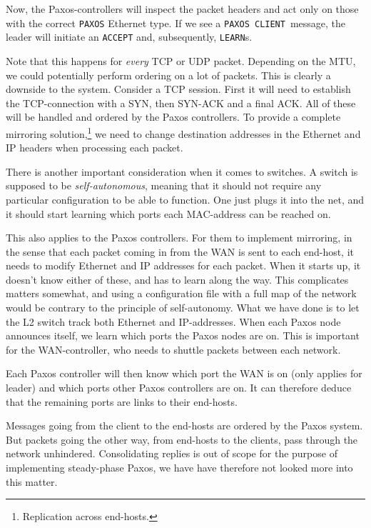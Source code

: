 Now, the Paxos-controllers will inspect the packet headers and act only on
those with the correct \texttt{PAXOS} Ethernet type.  If we see a
\texttt{PAXOS CLIENT} message, the leader will initiate an \texttt{ACCEPT}
and, subsequently, \texttt{LEARN}s.

Note that this happens for \textit{every} \ac{TCP} or \ac{UDP} packet.
Depending on the \ac{MTU}, we could potentially perform ordering on a lot of
packets.  This is clearly a downside to the system.  Consider a \acs{TCP}
session. First it will need to establish the \acs{TCP}-connection with a
SYN, then SYN-ACK and a final ACK.
All of these will be handled and ordered by the Paxos controllers.
To provide a complete mirroring solution,\footnote{Replication across
end-hosts.} we need to change destination addresses in the Ethernet and
\ac{IP} headers when processing each packet.

There is another important consideration when it comes to switches.
A switch is supposed to be \textit{self-autonomous}, meaning that it should
not require any particular configuration to be able to function. One just
plugs it into the net, and it should start learning which ports each
MAC-address can be reached on.  

This also applies to the Paxos controllers. For them to implement mirroring,
in the sense that each packet coming in from the \ac{WAN} is sent to
each end-host, it needs to modify Ethernet and IP addresses for each packet.
When it starts up, it doesn't know either of these, and has to learn along
the way.  This complicates matters somewhat, and using a configuration file
with a full map of the network would be contrary to the principle of
self-autonomy.  What we have done is to let the L2 switch track both
Ethernet and IP-addresses. When each Paxos node announces itself, we learn
which ports the Paxos nodes are on. This is important for the
WAN-controller, who needs to shuttle packets between each network.

Each Paxos controller will then know which port the WAN is on (only applies
for leader) and which ports other Paxos controllers are on. It can therefore
deduce that the remaining ports are links to their end-hosts.

Messages going from the client to the end-hosts are ordered by the Paxos
system. But packets going the other way, from end-hosts to the clients, pass
through the network unhindered.  Consolidating replies is out of scope for
the purpose of implementing steady-phase Paxos, we have have therefore not
looked more into this matter.

